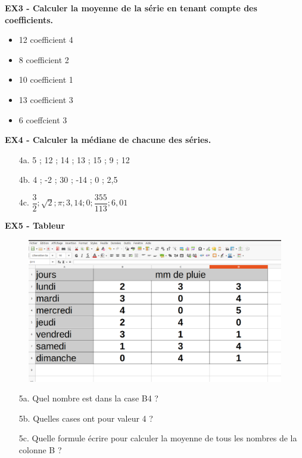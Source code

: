 \textbf{EX3 - Calculer la moyenne de la série en tenant compte des coefficients.}

\begin{minipage}[t]{0.2\textwidth}
  \begin{itemize}[label={$\bullet$}]
    \item 12 coefficient 4
    \item 8 coefficient 2
    \item 10 coefficient 1
    \item 13 coefficient 3
    \item 6 coeffcient 3 
  \end{itemize}
\end{minipage}
\begin{minipage}[t]{0.8\textwidth}
  \Pointilles[6]
\end{minipage}

\textbf{EX4 - Calculer la médiane de chacune des séries.}

\begin{multicols}{3}

\begin{enumerate}
  \item[4a.] 5 ; 12 ; 14 ; 13 ; 15 ; 9 ; 12 \\ \Pointilles[5]
  \item[4b.] 4 ; -2  ; 30 ; -14 ; 0 ; 2,5 \\ \Pointilles[5]
  \item[4c.] $\dfrac{3}{2} ; \sqrt{2} ; \pi ; 3,14 ; 0 ; \dfrac{355}{113} ; 6,01$ \\ \Pointilles[5]
\end{enumerate}

\end{multicols}

\newpage

\textbf{EX5 - Tableur}

\begin{figure}[H]
  \centering
  \includegraphics[width=0.5\linewidth]{4x8-statistiques/tab.png}
\end{figure}

\begin{enumerate}
  \item[5a.] Quel nombre est dans la case B4 ? \dotfill
  \item[5b.] Quelles cases ont pour valeur 4 ? \dotfill
  \item[5c.] Quelle formule écrire pour calculer la moyenne de tous les nombres de la colonne B ?  \\ \Pointilles[1]
\end{enumerate}

